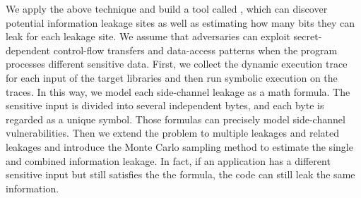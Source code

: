 We apply the above technique and build a tool called \tool{},
which can discover potential information leakage sites as well as estimating how
many bits they can leak for each leakage site. We assume that adversaries can
exploit secret-dependent control-flow transfers and data-access patterns when
the program processes different sensitive data.
First, we collect the dynamic execution trace for each input of the target
libraries and then run symbolic execution on the traces. In this way, we model
each side-channel leakage as a math formula. The sensitive input is divided into
several independent bytes, and each byte is regarded as a unique symbol. Those
formulas can precisely model side-channel vulnerabilities. Then we extend the
problem to multiple leakages and related leakages and introduce the Monte Carlo
sampling method to estimate the single and combined information leakage. In
fact, if an application has a different sensitive input but still satisfies the
the formula, the code can still leak the same information.





